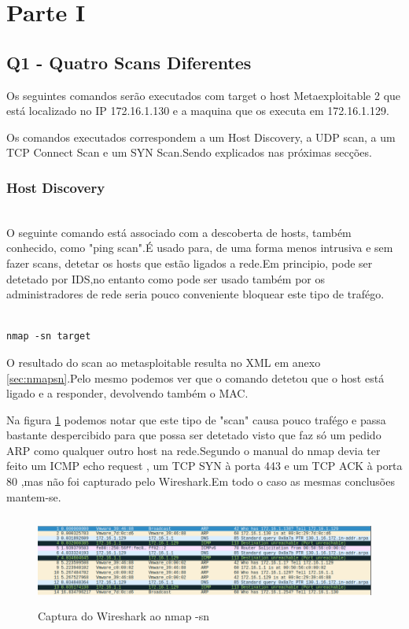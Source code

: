 \section{Parte I}

\subsection{Q1 - Quatro Scans Diferentes}

Os seguintes comandos serão executados com target o host Metaexploitable 2 que está localizado no IP 172.16.1.130 e a maquina que os executa em 172.16.1.129.

Os comandos executados correspondem a um Host Discovery, a UDP scan, a um TCP Connect Scan e um SYN Scan.Sendo explicados nas próximas secções. 

\subsubsection{Host Discovery}
\hfill\\

O seguinte comando está associado com a descoberta de hosts, também conhecido, como "ping scan".É usado para, de uma forma menos intrusiva e sem fazer scans, detetar os hosts que estão ligados a rede.Em principio, pode ser detetado por IDS,no entanto como pode ser usado também por os administradores de rede seria pouco conveniente bloquear este tipo de trafégo.

\begin{lstlisting}

nmap -sn target

\end{lstlisting}


O resultado do scan ao metasploitable resulta no XML em anexo \ref{sec:nmapsn}.Pelo mesmo podemos ver que o comando detetou que o host está ligado e a responder, devolvendo também o MAC.

Na figura \ref{fig:nmapsn} podemos notar que este tipo de "scan" causa pouco trafégo e passa bastante despercibido para que possa ser detetado visto que faz só um pedido ARP como qualquer outro host na rede.Segundo o manual do nmap devia ter feito um ICMP echo request , um TCP SYN à porta 443 e um TCP ACK à porta 80 ,mas não foi capturado pelo Wireshark.Em todo o caso as mesmas conclusões mantem-se.

\begin{figure}[h!]
	\centering
		
	\includegraphics[width=\textwidth,height=3cm,keepaspectratio]{images/nmapsn.png}
		
	\caption{Captura do Wireshark ao nmap -sn}
		
	\label{fig:nmapsn}
\end{figure}

